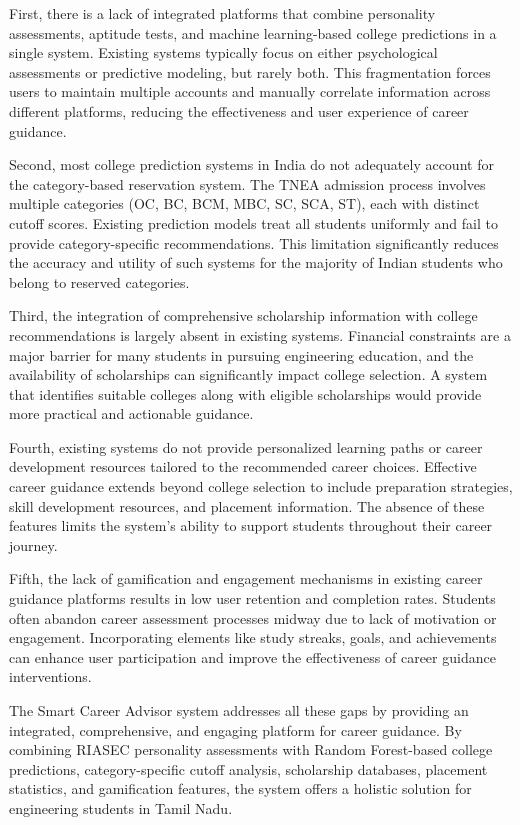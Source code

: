 \documentclass[journal]{IEEEtran}
\begin{document}
First, there is a lack of integrated platforms that combine personality assessments, aptitude tests, and machine learning-based college predictions in a single system. Existing systems typically focus on either psychological assessments or predictive modeling, but rarely both. This fragmentation forces users to maintain multiple accounts and manually correlate information across different platforms, reducing the effectiveness and user experience of career guidance.

Second, most college prediction systems in India do not adequately account for the category-based reservation system. The TNEA admission process involves multiple categories (OC, BC, BCM, MBC, SC, SCA, ST), each with distinct cutoff scores. Existing prediction models treat all students uniformly and fail to provide category-specific recommendations. This limitation significantly reduces the accuracy and utility of such systems for the majority of Indian students who belong to reserved categories.

Third, the integration of comprehensive scholarship information with college recommendations is largely absent in existing systems. Financial constraints are a major barrier for many students in pursuing engineering education, and the availability of scholarships can significantly impact college selection. A system that identifies suitable colleges along with eligible scholarships would provide more practical and actionable guidance.

Fourth, existing systems do not provide personalized learning paths or career development resources tailored to the recommended career choices. Effective career guidance extends beyond college selection to include preparation strategies, skill development resources, and placement information. The absence of these features limits the system's ability to support students throughout their career journey.

Fifth, the lack of gamification and engagement mechanisms in existing career guidance platforms results in low user retention and completion rates. Students often abandon career assessment processes midway due to lack of motivation or engagement. Incorporating elements like study streaks, goals, and achievements can enhance user participation and improve the effectiveness of career guidance interventions.

The Smart Career Advisor system addresses all these gaps by providing an integrated, comprehensive, and engaging platform for career guidance. By combining RIASEC personality assessments with Random Forest-based college predictions, category-specific cutoff analysis, scholarship databases, placement statistics, and gamification features, the system offers a holistic solution for engineering students in Tamil Nadu.
\end{document}

